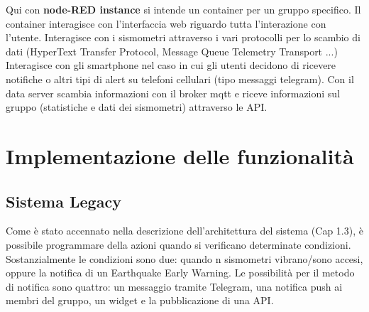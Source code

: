 \documentclass[a4paper,10pt]{memoir}
\begin{document}
\clearpage

Qui con \textbf{node-RED instance} si intende un container per un gruppo specifico.
Il container interagisce con l'interfaccia web riguardo tutta l'interazione con l'utente.
Interagisce con i sismometri attraverso i vari protocolli per lo scambio di dati (HyperText Transfer Protocol, Message Queue Telemetry Transport ...)
Interagisce con gli smartphone nel caso in cui gli utenti decidono di ricevere notifiche o altri tipi di alert su telefoni cellulari (tipo messaggi telegram).
Con il data server scambia informazioni con il broker mqtt e riceve informazioni sul gruppo (statistiche e dati dei sismometri) attraverso le API.

\chapter{Implementazione delle funzionalità}

\section{Sistema Legacy}

Come è stato accennato nella descrizione dell'architettura del sistema (Cap 1.3), è possibile programmare della azioni quando si verificano determinate condizioni.
Sostanzialmente le condizioni sono due: quando n sismometri vibrano/sono accesi, oppure la notifica di un Earthquake Early Warning.
Le possibilità per il metodo di notifica sono quattro: un messaggio tramite Telegram, una notifica push ai membri del gruppo, un widget e la pubblicazione di una API.
\end{document}
